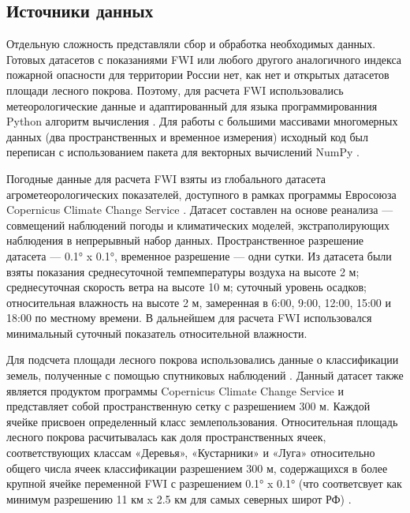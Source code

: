 \documentclass[a4paper,article,14pt]{extarticle}
\begin{document}
\subsection{Источники данных}

Отдельную сложность представляли сбор и обработка необходимых данных. Готовых датасетов с показаниями FWI или любого другого аналогичного индекса пожарной опасности для территории России нет, как нет и открытых датасетов площади лесного покрова. Поэтому, для расчета FWI использовались метеорологические данные и адаптированный для языка программированния Python \cite{VanRossumPythonReferenceManual2009} алгоритм вычисления \cite{WangUpdatedSourceCode2015}. Для работы с большими массивами многомерных данных (два пространственных и временное измерения) исходный код был переписан с использованием пакета для векторных вычислений NumPy \cite{HarrisArrayProgrammingNumPy2020}.

Погодные данные для расчета FWI взяты из глобального датасета агрометеорологических показателей, доступного в рамках программы Евросоюза Copernicus Climate Change Service \cite{BoogaardAgrometeorologicalIndicators19792019}. Датасет составлен на основе реанализа — совмещений наблюдений погоды и климатических моделей, экстраполирующих наблюдения в непрерывный набор данных. Пространственное разрешение датасета — 0.1° x 0.1°, временное разрешение — одни сутки. Из датасета были взяты показания среднесуточной темпемпературы воздуха на высоте 2 м; среднесуточная скорость ветра на высоте 10 м; суточный уровень осадков; относительная влажность на высоте 2 м, замеренная в 6:00, 9:00, 12:00, 15:00 и 18:00 по местному времени. В дальнейшем для расчета FWI использовался минимальный суточный показатель относительной влажности.

Для подсчета площади лесного покрова использовались данные о классификации земель, полученные с помощью спутниковых наблюдений \cite{CopernicusClimateChangeServiceLandCoverClassification2019}. Данный датасет также является продуктом программы Copernicus Climate Change Service и представляет собой пространственную сетку с разрешением 300 м. Каждой ячейке присвоен определенный класс землепользования. Относительная площадь лесного покрова расчитывалась как доля пространственных ячеек, соответствующих классам «Деревья», «Кустарники» и «Луга» относительно общего числа ячеек классификации разрешением 300 м, содержащихся в более крупной ячейке переменной FWI с разрешением 0.1° x 0.1° (что соответсвует как минимум разрешению 11 км x 2.5 км для самых северных широт РФ) \cite{PimontPredictionRegionalWildfire2021}.
\end{document}
